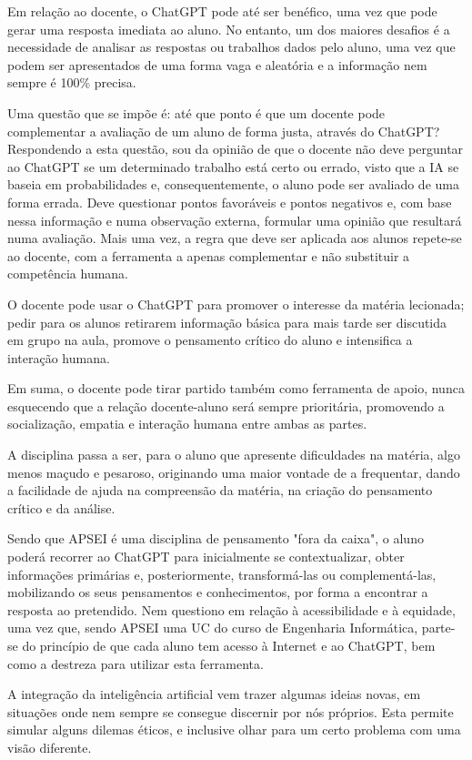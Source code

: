 \documentclass[portuguese, 11pt, a4paper, titlepage, oneside]{article}
\begin{document}
Em relação ao docente, o ChatGPT pode até ser benéfico, uma vez que pode gerar uma resposta imediata ao aluno. No entanto, um dos maiores desafios é a necessidade de analisar as respostas ou trabalhos dados pelo aluno, uma vez que podem ser apresentados de uma forma vaga e aleatória e a informação nem sempre é 100\% precisa.

Uma questão que se impõe é: até que ponto é que um docente pode complementar a avaliação de um aluno de forma justa, através do ChatGPT? Respondendo a esta questão, sou da opinião de que o docente não deve perguntar ao ChatGPT se um determinado trabalho está certo ou errado, visto que a IA se baseia em probabilidades e, consequentemente, o aluno pode ser avaliado de uma forma errada. Deve questionar pontos favoráveis e pontos negativos e, com base nessa informação e numa observação externa, formular uma opinião que resultará numa avaliação. Mais uma vez, a regra que deve ser aplicada aos alunos repete-se ao docente, com a ferramenta a apenas complementar e não substituir a competência humana.

O docente pode usar o ChatGPT para promover o interesse da matéria lecionada; pedir para os alunos retirarem informação básica para mais tarde ser discutida em grupo na aula, promove o pensamento crítico do aluno e intensifica a interação humana.

Em suma, o docente pode tirar partido também como ferramenta de apoio, nunca esquecendo que a relação docente-aluno será sempre prioritária, promovendo a socialização, empatia e interação humana entre ambas as partes.

A disciplina passa a ser, para o aluno que apresente dificuldades na matéria, algo menos maçudo e pesaroso, originando uma maior vontade de a frequentar, dando a facilidade de ajuda na compreensão da matéria, na criação do pensamento crítico e da análise.

Sendo que APSEI é uma disciplina de pensamento "fora da caixa", o aluno poderá recorrer ao ChatGPT para inicialmente se contextualizar, obter informações primárias e, posteriormente, transformá-las ou complementá-las, mobilizando os seus pensamentos e conhecimentos, por forma a encontrar a resposta ao pretendido. Nem questiono em relação à acessibilidade e à equidade, uma vez que, sendo APSEI uma UC do curso de Engenharia Informática, parte-se do princípio de que cada aluno tem acesso à Internet e ao ChatGPT, bem como a destreza para utilizar esta ferramenta.

A integração da inteligência artificial vem trazer algumas ideias novas, em situações onde nem sempre se consegue discernir por nós próprios. Esta permite simular alguns dilemas éticos, e inclusive olhar para um certo problema com uma visão diferente.
\end{document}
